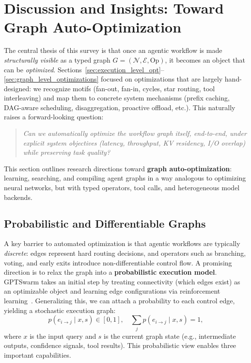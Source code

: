 \section{Discussion and Insights: Toward Graph Auto-Optimization}
\label{sec:discussion_insights}

The central thesis of this survey is that once an agentic workflow is made \emph{structurally visible} as a typed graph $G=(\mathcal{N},\mathcal{E},\mathrm{Op})$, it becomes an object that can be \emph{optimized}. Sections~\ref{sec:execution_level_opt}--\ref{sec:graph_level_optimizations} focused on optimizations that are largely hand-designed: we recognize motifs (fan-out, fan-in, cycles, star routing, tool interleaving) and map them to concrete system mechanisms (prefix caching, DAG-aware scheduling, disaggregation, proactive offload, etc.). This naturally raises a forward-looking question:

\begin{quote}
\emph{Can we automatically optimize the workflow graph itself, end-to-end, under explicit system objectives (latency, throughput, KV residency, I/O overlap) while preserving task quality?}
\end{quote}

This section outlines research directions toward \textbf{graph auto-optimization}: learning, searching, and compiling agent graphs in a way analogous to optimizing neural networks, but with typed operators, tool calls, and heterogeneous model backends.

\subsection{Probabilistic and Differentiable Graphs}
\label{sec:probabilistic_graphs}

A key barrier to automated optimization is that agentic workflows are typically \emph{discrete}: edges represent hard routing decisions, and operators such as branching, voting, and early exits introduce non-differentiable control flow. A promising direction is to relax the graph into a \textbf{probabilistic execution model}. GPTSwarm takes an initial step by treating connectivity (which edges exist) as an optimizable object and learning edge configurations via reinforcement learning~\citep{zhuge2024gptswarm}. Generalizing this, we can attach a probability to each control edge, yielding a stochastic execution graph:
\[
p(e_{i\to j}\mid x, s) \in [0,1], \quad \sum_{j} p(e_{i\to j}\mid x, s)=1,
\]
where $x$ is the input query and $s$ is the current graph state (e.g., intermediate outputs, confidence signals, tool results). This probabilistic view enables three important capabilities.

